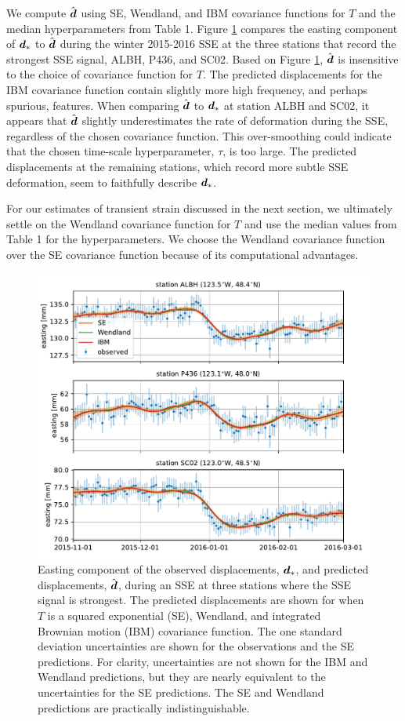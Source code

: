 \documentclass[extra,mreferee]{gji}
\begin{document}
We compute $\hat{\data}$ using SE, Wendland, and IBM covariance
functions for $T$ and the median hyperparameters from Table 1. Figure
\ref{fig:Fit} compares the easting component of $\data_*$ to
$\hat{\data}$ during the winter 2015-2016 SSE at the three stations
that record the strongest SSE signal, ALBH, P436, and SC02. Based on
Figure \ref{fig:Fit}, $\hat{\data}$ is insensitive to the choice of
covariance function for $T$. The predicted displacements for the IBM
covariance function contain slightly more high frequency, and perhaps
spurious, features. When comparing $\hat{\data}$ to $\data_*$ at
station ALBH and SC02, it appears that $\hat{\data}$ slightly
underestimates the rate of deformation during the SSE, regardless of
the chosen covariance function. This over-smoothing could indicate
that the chosen time-scale hyperparameter, $\tau$, is too large. The
predicted displacements at the remaining stations, which record more
subtle SSE deformation, seem to faithfully describe $\data_*$.

For our estimates of transient strain discussed in the next section,
we ultimately settle on the Wendland covariance function for $T$ and
use the median values from Table 1 for the hyperparameters. We choose
the Wendland covariance function over the SE covariance function
because of its computational advantages.

\begin{figure}
\includegraphics{figures/signal_fit/signal-fit.pdf}
\caption{
Easting component of the observed displacements, $\data_*$, and
predicted displacements, $\hat{\data}$, during an SSE at three
stations where the SSE signal is strongest. The predicted
displacements are shown for when $T$ is a squared exponential (SE),
Wendland, and integrated Brownian motion (IBM) covariance function.
The one standard deviation uncertainties are shown for the
observations and the SE predictions. For clarity, uncertainties are
not shown for the IBM and Wendland predictions, but they are nearly
equivalent to the uncertainties for the SE predictions. The SE and
Wendland predictions are practically indistinguishable.
}   
\label{fig:Fit}
\end{figure}
\end{document}

